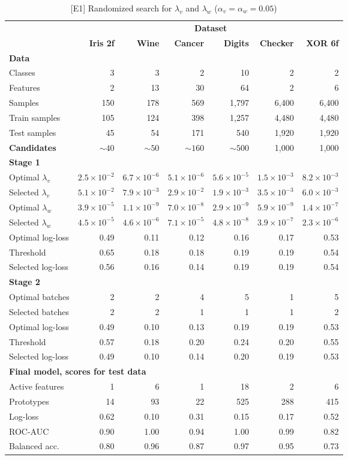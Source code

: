 %
\begin{table}
\caption{[E1] Randomized search for $\lambda_v$ and $\lambda_w$ ($\alpha_v=\alpha_w=0.05$)}
\label{tab_e1}
%
\begin{center}
\small
\begin{tabular}{|lrrrrrr|}
\hline
&\multicolumn{6}{c|}{\textbf{\hrulefill\ Dataset \hrulefill}}\\
&\textbf{Iris 2f}&\textbf{Wine}&\textbf{Cancer}&\textbf{Digits}&\textbf{Checker}&\textbf{XOR 6f}\\
\multicolumn{7}{|l|}{\textbf{Data}}\\
Classes&3&3&2&10&2&2\\
Features&2&13&30&64&2&6\\
Samples&150&178&569&1,797&6,400&6,400\\
Train samples&105&124&398&1,257&4,480&4,480\\
Test samples&45&54&171&540&1,920&1,920\\
\textbf{Candidates}&$\sim40$&$\sim50$&$\sim160$&$\sim500$&1,000&1,000\\
\multicolumn{7}{|l|}{\textbf{Stage 1}}\\
Optimal $\lambda_v$&$2.5\times10^{-2}$&$6.7\times10^{-6}$&$5.1\times10^{-6}$&$5.6\times10^{-5}$&$1.5\times10^{-3}$&$8.2\times10^{-3}$\\
Selected $\lambda_v$&$5.1\times10^{-2}$&$7.9\times10^{-3}$&$2.9\times10^{-2}$&$1.9\times10^{-3}$&$3.5\times10^{-3}$&$6.0\times10^{-3}$\\
Optimal $\lambda_w$&$3.9\times10^{-5}$&$1.1\times10^{-9}$&$7.0\times10^{-8}$&$2.9\times10^{-9}$&$5.9\times10^{-9}$&$1.4\times10^{-7}$\\
Selected $\lambda_w$&$4.5\times10^{-5}$&$4.6\times10^{-6}$&$7.1\times10^{-5}$&$4.8\times10^{-8}$&$3.9\times10^{-7}$&$2.3\times10^{-6}$\\
Optimal log-loss&0.49&0.11&0.12&0.16&0.17&0.53\\
Threshold&0.65&0.18&0.18&0.19&0.19&0.54\\
Selected log-loss&0.56&0.16&0.14&0.19&0.19&0.54\\
\multicolumn{7}{|l|}{\textbf{Stage 2}}\\
Optimal batches&2&2&4&5&1&5\\
Selected batches&2&2&1&1&1&2\\
Optimal log-loss&0.49&0.10&0.13&0.19&0.19&0.53\\
Threshold&0.57&0.18&0.20&0.24&0.20&0.55\\
Selected log-loss&0.49&0.10&0.14&0.20&0.19&0.53\\
\multicolumn{7}{|l|}{\textbf{Final model, scores for test data}}\\
Active features&1&6&1&18&2&6\\
Prototypes&14&93&22&525&288&415\\
Log-loss&0.62&0.10&0.31&0.15&0.17&0.52\\
ROC-AUC&0.90&1.00&0.94&1.00&0.99&0.82\\
Balanced acc.&0.80&0.96&0.87&0.97&0.95&0.73\\
\hline
\end{tabular}
\end{center}
\end{table}

